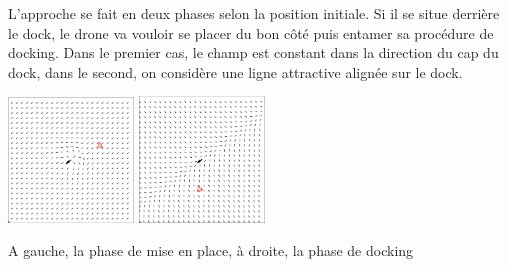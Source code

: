 \documentclass[portrait,final,a0paper,fontscale=0.3]{baposter}
\begin{document}
\begin{poster}
{	L'approche se fait en deux phases selon la position initiale. Si il se situe derrière le dock,
	le drone va vouloir se placer du bon côté puis entamer sa procédure de docking. Dans le premier cas,
	le champ est constant dans la direction du cap du dock, dans le second, on considère une ligne attractive
	alignée sur le dock.

	\begin{center}
		\includegraphics[width=0.25\textwidth]{ScreenshotCase2.png}
		\hfil
		\includegraphics[width=0.25\textwidth]{ScreenshotCase1.png}
		
		A gauche, la phase de mise en place, à droite, la phase de docking
	\end{center}
}



\end{poster}
\end{document}
